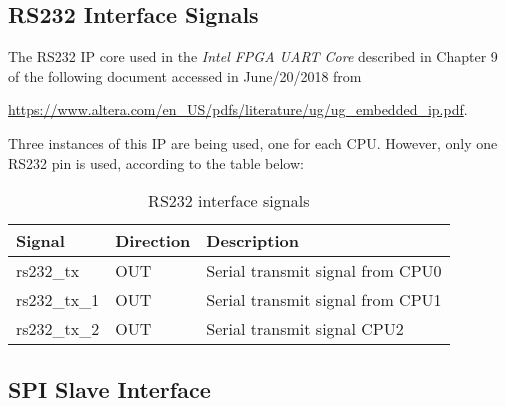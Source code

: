 \documentclass{ug}
\theoremstyle{plain}
\begin{document}
\subsection{RS232 Interface Signals}

The RS232 IP core used in the {\it Intel FPGA UART Core} described in Chapter 9
of the following document accessed in June/20/2018 from

\hyperlink{https://www.altera.com/en\_US/pdfs/literature/ug/ug\_embedded\_ip.pdf}{https://www.altera.com/en\_US/pdfs/literature/ug/ug\_embedded\_ip.pdf}.

Three instances of this IP are being used, one for each CPU. However, only one
RS232 pin is used, according to the table below:

\begin{table}[H]
  \begin{center}
    \begin{tabular}{|l|l|p{8cm}|}
      \hline
      \rowcolor{iob-green}
      \textbf{Signal} & \textbf{Direction} & \textbf{Description} \\
      \hline
      \hline

      rs232\_tx &  OUT & Serial transmit signal from CPU0\\
      \hline

      rs232\_tx\_1 &  OUT & Serial transmit signal from CPU1\\
      \hline

      rs232\_tx\_2 &  OUT & Serial transmit signal CPU2\\
      \hline

    \end{tabular}
    \caption{RS232 interface signals}
    \label{tab:rs232}
  \end{center}
\end{table}
\clearpage

      
\subsection{SPI Slave Interface}
\end{document}
